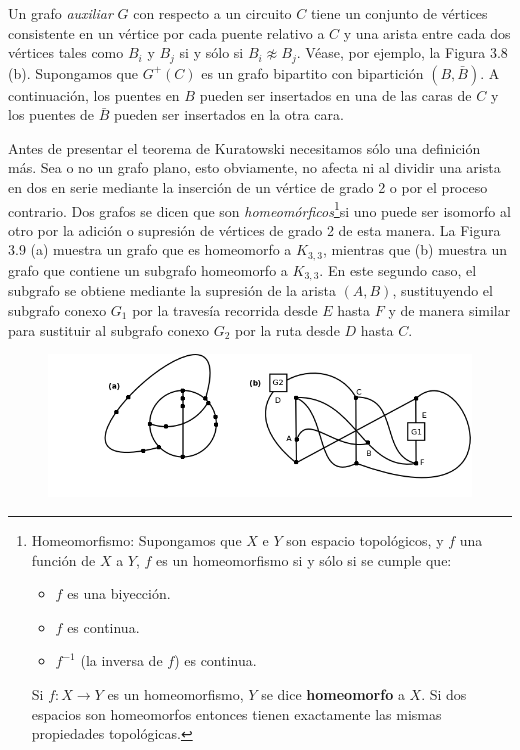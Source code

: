 \documentclass[10pt,a5paper]{book}
\begin{document}
Un grafo \emph{auxiliar} $G$ con respecto a un circuito $C$ tiene un conjunto de vértices consistente en un vértice por cada puente relativo a $C$ y una arista entre cada dos vértices tales como $B_i$ y $B_j$ si y sólo si $B_i \not \approx B_j$. Véase, por ejemplo, la Figura 3.8 (b). Supongamos que $G^+(C)$ es un grafo bipartito con bipartición $(B,\bar{B})$. A continuación, los puentes en $B$ pueden ser insertados en una de las caras de $C$ y los puentes de $\bar{B}$ pueden ser insertados en la otra cara.

Antes de presentar el teorema de Kuratowski necesitamos sólo una definición más. Sea o no un grafo plano, esto obviamente, no afecta ni al dividir una arista en dos en serie mediante la inserción de un vértice de grado 2 o por el proceso contrario. Dos grafos se dicen que son \emph{homeomórficos}\footnote{Homeomorfismo: Supongamos que $X$ e $Y$ son espacio topológicos, y $f$ una función de $X$ a $Y$, $f$ es un homeomorfismo si y sólo si se cumple que:
\begin{itemize}
\item $f$ es una biyección.
\item $f$ es continua.
\item $f^{-1}$ (la inversa de $f$) es continua.
\end{itemize}
Si $f: X \rightarrow Y$ es un homeomorfismo, $Y$ se dice \textbf{homeomorfo} a $X$. Si dos espacios son homeomorfos entonces tienen exactamente las mismas propiedades topológicas.}si uno puede ser isomorfo al otro por la adición o supresión de vértices de grado 2 de esta manera. La Figura 3.9 (a) muestra un grafo que es homeomorfo a $K_{3,3}$, mientras que (b) muestra un grafo que contiene un subgrafo homeomorfo a $K_{3,3}$. En este segundo caso, el subgrafo se obtiene mediante la supresión de la arista $(A,B)$, sustituyendo el subgrafo conexo $G_1$ por la travesía recorrida desde $E$ hasta $F$ y de manera similar para sustituir al subgrafo conexo $G_2$ por la ruta desde $D$ hasta $C$.
\vfill
\pagebreak
\begin{figure}[H]
\caption{ }
\hspace*{-1.2in}\includegraphics[scale=.4]{Fig3_9.png}
\end{figure}
\end{document}
